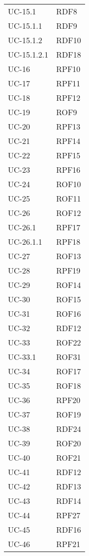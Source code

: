 \begin{longtable}{| p{5cm} | p{5cm} |}
		UC-15.1 & RDF8\\
		UC-15.1.1 & RDF9\\
		\rowcolor{LightGray}
		UC-15.1.2 & RDF10\\
		UC-15.1.2.1 & RDF18\\
		\rowcolor{LightGray}
		UC-16 & RPF10\\
		UC-17 & RPF11\\
		\rowcolor{LightGray}
		UC-18 & RPF12 \\
		UC-19 & ROF9 \\
		\rowcolor{LightGray}
		UC-20 & RPF13 \\
		UC-21 & RPF14 \\
		\rowcolor{LightGray}
		UC-22 & RPF15 \\ 
		UC-23 & RPF16\\
		\rowcolor{LightGray}
		UC-24 & ROF10 \\
		UC-25 & ROF11 \\
		\rowcolor{LightGray}
		UC-26 & ROF12 \\
		UC-26.1 & RPF17 \\
		\rowcolor{LightGray}
		UC-26.1.1 & RPF18\\
		UC-27 & ROF13 \\
		\rowcolor{LightGray}
		UC-28 & RPF19 \\
		UC-29 & ROF14 \\
		\rowcolor{LightGray}
		UC-30 & ROF15 \\
		UC-31 & ROF16 \\
		\rowcolor{LightGray}
		UC-32 & RDF12\\
		UC-33 & ROF22\\
		\rowcolor{LightGray}
		UC-33.1 & ROF31\\
		UC-34 & ROF17\\
		\rowcolor{LightGray}
		UC-35 & ROF18\\
		UC-36 & RPF20\\
		\rowcolor{LightGray}
		UC-37 & ROF19\\
		UC-38 & RDF24\\
		\rowcolor{LightGray}
		UC-39 & ROF20\\
		UC-40 & ROF21\\
		\rowcolor{LightGray}
		UC-41 & RDF12\\
		UC-42 & RDF13\\
		\rowcolor{LightGray}
		UC-43 & RDF14\\
		UC-44 & RPF27\\
		\rowcolor{LightGray}
		UC-45 & RDF16\\
		UC-46 & RPF21\\

\end{longtable}

